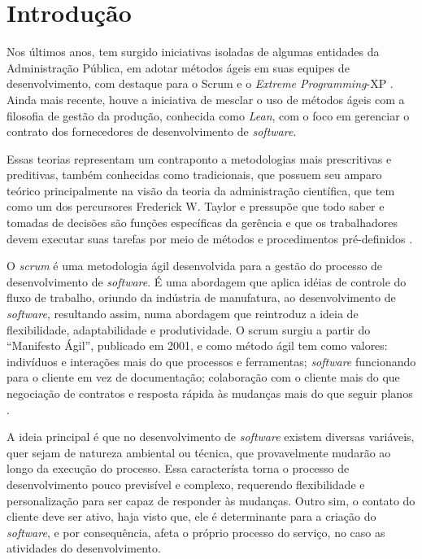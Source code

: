 \section{Introdução}
\label{intro}

Nos últimos anos, tem surgido iniciativas isoladas de algumas entidades da Administração Pública, em adotar métodos ágeis em suas equipes de desenvolvimento, com destaque para o Scrum e o \textit{Extreme Programming}-XP \cite{TCU:2013} \cite{RTMAC}.  Ainda mais recente, houve a iniciativa de mesclar o uso de métodos ágeis com a filosofia de gestão da produção, conhecida como \textit{Lean}, com o foco em gerenciar o contrato dos fornecedores de desenvolvimento de \textit{software}. 


Essas teorias representam um contraponto a metodologias mais prescritivas e preditivas, também conhecidas como tradicionais, que possuem seu amparo teórico principalmente na visão da teoria da administração científica, que tem como um dos percursores Frederick W. Taylor e pressupõe que todo saber e tomadas de decisões são funções específicas da gerência e que os trabalhadores devem executar suas tarefas por meio de métodos e procedimentos pré-definidos \cite{administracao}.

O \textit{scrum} é uma metodologia ágil desenvolvida para a gestão do processo de desenvolvimento de \textit{software}. É uma abordagem que aplica idéias de controle do fluxo de trabalho, oriundo da indústria de manufatura, ao desenvolvimento de \textit{software}, resultando assim, numa abordagem que reintroduz a ideia de flexibilidade, adaptabilidade e produtividade. O scrum surgiu a partir do “Manifesto Ágil”, publicado em 2001, e como método ágil tem como valores: indivíduos e interações mais do que processos e ferramentas; \textit{software} funcionando para o cliente em vez de documentação; colaboração com o cliente mais do que negociação de contratos e resposta rápida às mudanças mais do que seguir planos \cite{manifesto}. 

A ideia principal é que no desenvolvimento de \textit{software} existem diversas variáveis, quer sejam de natureza ambiental ou técnica, que provavelmente mudarão ao longo da execução do processo. Essa característa torna o processo de desenvolvimento pouco previsível e complexo, requerendo flexibilidade e personalização para ser capaz de responder às mudanças. Outro sim, o contato do cliente deve ser ativo, haja visto que, ele é determinante para a criação do \textit{software}, e por consequência, afeta o próprio processo do serviço, no caso as atividades do desenvolvimento.

